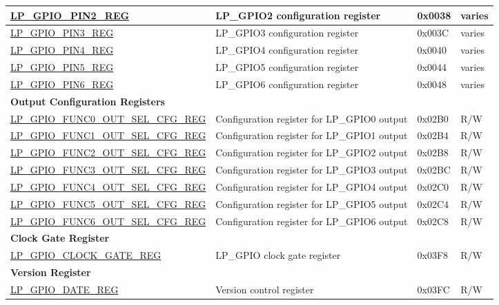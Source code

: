 \begin{longtable}{ | p{6cm} | p{6.5cm} | p{1.3cm} | p{1.7cm} | }
\hyperref[regdesc:LPGPIOPINNREG]{LP\_GPIO\_PIN2\_REG} & LP\_GPIO2 configuration register & 0x0038 & varies \\ \hline
\hyperref[regdesc:LPGPIOPINNREG]{LP\_GPIO\_PIN3\_REG} & LP\_GPIO3 configuration register & 0x003C & varies \\ \hline
\hyperref[regdesc:LPGPIOPINNREG]{LP\_GPIO\_PIN4\_REG} & LP\_GPIO4 configuration register & 0x0040 & varies \\ \hline
\hyperref[regdesc:LPGPIOPINNREG]{LP\_GPIO\_PIN5\_REG} & LP\_GPIO5 configuration register & 0x0044 & varies \\ \hline
\hyperref[regdesc:LPGPIOPINNREG]{LP\_GPIO\_PIN6\_REG} & LP\_GPIO6 configuration register & 0x0048 & varies \\ \hline
\multicolumn{4}{|l|}{\textbf{Output Configuration Registers}} \\ \hline
\hyperref[regdesc:LPGPIOFUNCNOUTSELCFGREG]{LP\_GPIO\_FUNC0\_OUT\_SEL\_CFG\_REG} & Configuration register for LP\_GPIO0 output & 0x02B0 & R/W \\ \hline
\hyperref[regdesc:LPGPIOFUNCNOUTSELCFGREG]{LP\_GPIO\_FUNC1\_OUT\_SEL\_CFG\_REG} & Configuration register for LP\_GPIO1 output & 0x02B4 & R/W \\ \hline
\hyperref[regdesc:LPGPIOFUNCNOUTSELCFGREG]{LP\_GPIO\_FUNC2\_OUT\_SEL\_CFG\_REG} & Configuration register for LP\_GPIO2 output & 0x02B8 & R/W \\ \hline
\hyperref[regdesc:LPGPIOFUNCNOUTSELCFGREG]{LP\_GPIO\_FUNC3\_OUT\_SEL\_CFG\_REG} & Configuration register for LP\_GPIO3 output & 0x02BC & R/W \\ \hline
\hyperref[regdesc:LPGPIOFUNCNOUTSELCFGREG]{LP\_GPIO\_FUNC4\_OUT\_SEL\_CFG\_REG} & Configuration register for LP\_GPIO4 output & 0x02C0 & R/W \\ \hline
\hyperref[regdesc:LPGPIOFUNCNOUTSELCFGREG]{LP\_GPIO\_FUNC5\_OUT\_SEL\_CFG\_REG} & Configuration register for LP\_GPIO5 output & 0x02C4 & R/W \\ \hline
\hyperref[regdesc:LPGPIOFUNCNOUTSELCFGREG]{LP\_GPIO\_FUNC6\_OUT\_SEL\_CFG\_REG} & Configuration register for LP\_GPIO6 output & 0x02C8 & R/W \\ \hline
\multicolumn{4}{|l|}{\textbf{Clock Gate Register}} \\ \hline
\hyperref[regdesc:LPGPIOCLOCKGATEREG]{LP\_GPIO\_CLOCK\_GATE\_REG} & LP\_GPIO clock gate register & 0x03F8 & R/W \\ \hline
\multicolumn{4}{|l|}{\textbf{Version Register}} \\ \hline
\hyperref[regdesc:LPGPIODATEREG]{LP\_GPIO\_DATE\_REG} & Version control  register & 0x03FC & R/W \\ \hline
\end{longtable}
